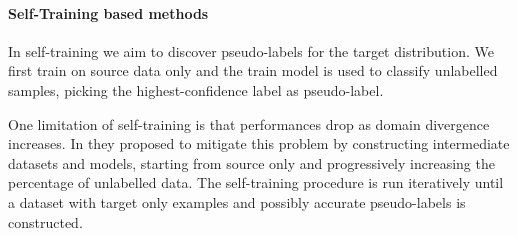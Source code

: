 \paragraph{Self-Training based methods}
In self-training we aim to discover pseudo-labels for the target distribution. We first train on source data only and the train model is used to classify unlabelled samples, picking the highest-confidence label as pseudo-label.

One limitation of self-training is that performances drop as domain divergence increases. In \cite[Zhang et al.]{Deng2021} they proposed to mitigate this problem by constructing intermediate datasets and models, starting from source only and progressively increasing the percentage of unlabelled data. The self-training procedure is run iteratively until a dataset with target only examples and possibly accurate pseudo-labels is constructed.


